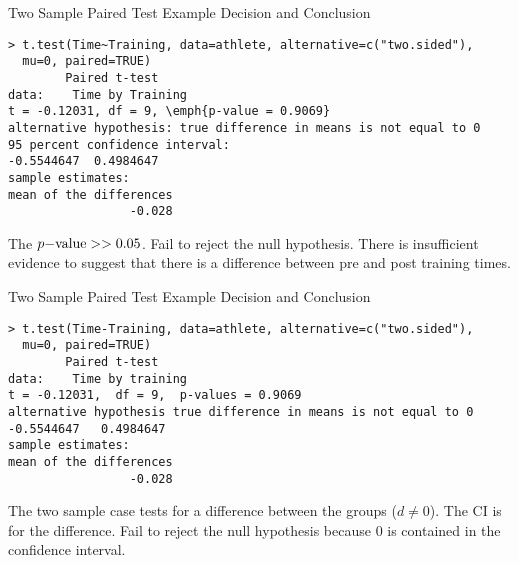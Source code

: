 \documentclass[xcolor=svgnames, 10pt, handout]{beamer}
\begin{document}
\begin{frame}[fragile]{Two Sample Paired Test Example  Decision and Conclusion}
\begin{Verbatim}[xleftmargin=2em, xrightmargin=1.5em, frame=single, label=Using P-value, framesep=0.5em, commandchars=\\\{\}, fontsize=\footnotesize]
> t.test(Time~Training, data=athlete, alternative=c("two.sided"),
  mu=0, paired=TRUE)
        Paired t-test
data:    Time by Training
t = -0.12031, df = 9, \emph{p-value = 0.9069}
alternative hypothesis: true difference in means is not equal to 0
95 percent confidence interval:
-0.5544647  0.4984647
sample estimates:
mean of the differences
                 -0.028
\end{Verbatim}
The $p{\rm -value}>>0.05$.
\vfill
Fail to reject the null hypothesis.  There is insufficient evidence to suggest that there is a difference between pre and post training times.
\end{frame}


\begin{frame}[fragile]{Two Sample Paired Test Example Decision and Conclusion}
\begin{Verbatim}[xleftmargin=2em, xrightmargin=1.5em, frame=single, label=Using CI, framesep=0.5em, commandchars=\\\{\}, fontsize=\footnotesize]
> t.test(Time-Training, data=athlete, alternative=c("two.sided"), 
  mu=0, paired=TRUE)
        Paired t-test
data:    Time by training
t = -0.12031,  df = 9,  p-values = 0.9069
alternative hypothesis true difference in means is not equal to 0
-0.5544647   0.4984647
sample estimates:
mean of the differences
                 -0.028
\end{Verbatim}
The two sample case tests for a difference between the groups ($d \neq 0$).  The CI is for the difference.
\vfill
Fail to reject the null hypothesis because 0 is contained in the confidence interval.
\end{frame}
\end{document}

